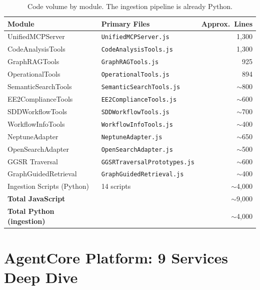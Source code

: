 \documentclass[11pt,letterpaper]{article}
\begin{document}
\begin{table}[H]
\centering
\footnotesize
\begin{tabular}{@{}llr@{}}
\toprule
\textbf{Module} & \textbf{Primary Files} & \textbf{Approx.\ Lines} \\
\midrule
UnifiedMCPServer & \texttt{UnifiedMCPServer.js} & 1,300 \\
CodeAnalysisTools & \texttt{CodeAnalysisTools.js} & 1,300 \\
GraphRAGTools & \texttt{GraphRAGTools.js} & 925 \\
OperationalTools & \texttt{OperationalTools.js} & 894 \\
SemanticSearchTools & \texttt{SemanticSearchTools.js} & $\sim$800 \\
EE2ComplianceTools & \texttt{EE2ComplianceTools.js} & $\sim$600 \\
SDDWorkflowTools & \texttt{SDDWorkflowTools.js} & $\sim$700 \\
WorkflowInfoTools & \texttt{WorkflowInfoTools.js} & $\sim$400 \\
NeptuneAdapter & \texttt{NeptuneAdapter.js} & $\sim$650 \\
OpenSearchAdapter & \texttt{OpenSearchAdapter.js} & $\sim$500 \\
GGSR Traversal & \texttt{GGSRTraversalPrototypes.js} & $\sim$600 \\
GraphGuidedRetrieval & \texttt{GraphGuidedRetrieval.js} & $\sim$400 \\
Ingestion Scripts (Python) & 14 scripts & $\sim$4,000 \\
\midrule
\textbf{Total JavaScript} & & $\sim$9,000 \\
\textbf{Total Python (ingestion)} & & $\sim$4,000 \\
\bottomrule
\end{tabular}
\caption{Code volume by module. The ingestion pipeline is already Python.}
\end{table}


\section{AgentCore Platform: 9 Services Deep Dive}
\end{document}
